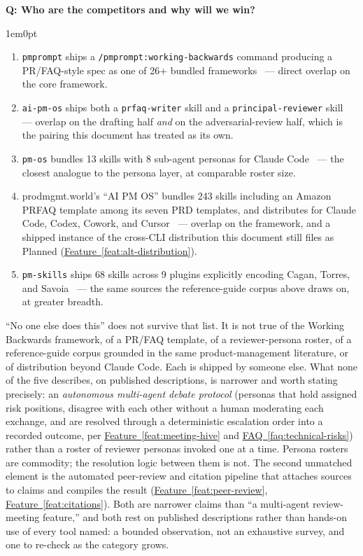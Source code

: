 \documentclass[11pt,letterpaper]{article}
\newcounter{faqnum}
\newenvironment{faqpair}[1]{%
  \needspace{4\baselineskip}%
  \vspace{0.5em}%
  \refstepcounter{faqnum}%
  \noindent\textbf{\color{SectionBlue}Q\thefaqnum: #1}\par\nopagebreak[4]%
  \vspace{0.2em}%
  \begin{adjustwidth}{1em}{0pt}%
  \setlength{\parindent}{0pt}%
}{%
  \end{adjustwidth}%
  \vspace{0.5em}%
}
\newcommand{\faqref}[1]{\hyperref[#1]{FAQ~\ref*{#1}}}
\newcommand{\featureref}[1]{\hyperref[#1]{Feature~\ref*{#1}}}
\begin{document}
\begin{faqpair}{Who are the competitors and why will we win?}
  \begin{enumerate}[nosep]
    \item[(1)] \texttt{pmprompt} ships a \texttt{/pmprompt:working-backwards} command producing a PR/FAQ-style spec as one of 26+ bundled frameworks~\cite{pmprompt2026} --- direct overlap on the core framework.
    \item[(2)] \texttt{ai-pm-os} ships both a \texttt{prfaq-writer} skill and a \texttt{principal-reviewer} skill~\cite{aipmos2026} --- overlap on the drafting half \textit{and} on the adversarial-review half, which is the pairing this document has treated as its own.
    \item[(3)] \texttt{pm-os} bundles 13 skills with 8 sub-agent personas for Claude Code~\cite{sevanpro2026pmos} --- the closest analogue to the persona layer, at comparable roster size.
    \item[(4)] prodmgmt.world's ``AI PM OS'' bundles 243 skills including an Amazon PRFAQ template among its seven PRD templates, and distributes for Claude Code, Codex, Cowork, and Cursor~\cite{prodmgmtworld2026aipmos} --- overlap on the framework, and a shipped instance of the cross-CLI distribution this document still files as Planned (\featureref{feat:alt-distribution}).
    \item[(5)] \texttt{pm-skills} ships 68 skills across 9 plugins explicitly encoding Cagan, Torres, and Savoia~\cite{pmskills2026} --- the same sources the reference-guide corpus above draws on, at greater breadth.
  \end{enumerate}

  \noindent ``No one else does this'' does not survive that list. It is not true of the Working Backwards framework, of a PR/FAQ template, of a reviewer-persona roster, of a reference-guide corpus grounded in the same product-management literature, or of distribution beyond Claude Code. Each is shipped by someone else. What none of the five describes, on published descriptions, is narrower and worth stating precisely: an \textit{autonomous multi-agent debate protocol} (personas that hold assigned risk positions, disagree with each other without a human moderating each exchange, and are resolved through a deterministic escalation order into a recorded outcome, per \featureref{feat:meeting-hive} and \faqref{faq:technical-risks}) rather than a roster of reviewer personas invoked one at a time. Persona rosters are commodity; the resolution logic between them is not. The second unmatched element is the automated peer-review and citation pipeline that attaches sources to claims and compiles the result (\featureref{feat:peer-review}, \featureref{feat:citations}). Both are narrower claims than ``a multi-agent review-meeting feature,'' and both rest on published descriptions rather than hands-on use of every tool named: a bounded observation, not an exhaustive survey, and one to re-check as the category grows.


\end{faqpair}
\end{document}
